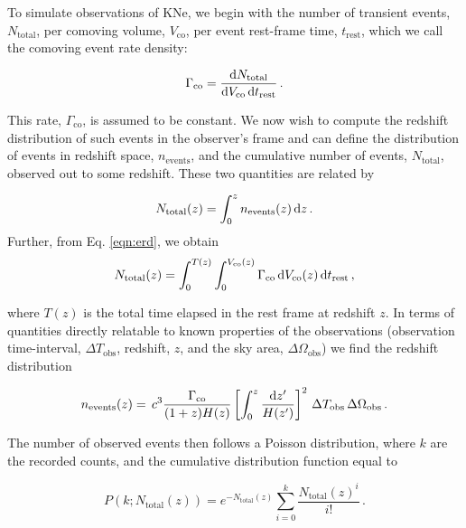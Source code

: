 To simulate observations of KNe, we begin with the number of transient events, $N_{\mathrm{total}}$, per comoving volume, $V_{\mathrm{co}}$, per event rest-frame time, $t_{\mathrm{rest}}$, which we call the comoving event rate density:

\begin{equation}\label{eqn:erd}
   \Gamma_{\mathrm{co}} =\frac{\mathrm{d} N_{\mathrm{total}}}{\mathrm{d} V_{\mathrm{co}}\, \mathrm{d} t_{\mathrm{rest}}}\,.
\end{equation}

This rate, $\Gamma_{\mathrm{co}}$, is assumed to be constant. We now wish to compute the redshift distribution of such events in the observer's frame and can define the distribution of events in redshift space, $n_{\mathrm{events}}$, and the cumulative number of events, $N_{\mathrm{total}}$, observed out to some redshift. These two quantities are related by

\begin{equation}\label{eqn:total_dist}
N_{\mathrm{total}}(z) = \int_0^{z} n_{\mathrm{events}}(z) \, \mathrm{d} z\,.
\end{equation}
Further, from Eq. \ref{eqn:erd}, we obtain
\begin{equation}
N_{\mathrm{ total}}(z) = \int_0^{T (z)} \int_0^{V_{\mathrm{co}}(z)}  \Gamma_{\mathrm{co}} \, \mathrm{d} V_{\mathrm{co}}(z) \,\mathrm{d} t_{\mathrm{rest}} \, ,
\end{equation}

where $T(z)$ is the total time elapsed in the rest frame at redshift $z$. In terms of quantities directly relatable to known properties of the observations (observation time-interval, $\Delta T_{\mathrm{obs}}$, redshift, $z$, and the sky area, $\Delta \Omega_{\mathrm{obs}}$) we find the redshift distribution

\begin{align}\label{eqn:reddist}
n_{\mathrm{events}}(z) = \, c^3  \frac{\Gamma_{\mathrm{co}}}{(1+z)H(z)} \left[\int^{z}_0 \frac{\mathrm{d} z'}{H(z')} \right]^2 \, \Delta T_{\mathrm{obs}} \, \Delta \Omega_{\mathrm{obs}}\,.
\end{align}

The number of observed events then follows a Poisson distribution, where $k$ are the recorded counts, and the cumulative distribution function equal to

\begin{equation}\label{eqn:invcum}
P(k;N_{\mathrm{total}}(z)) =e^{-N_{\mathrm{ total}}(z)} \sum_{i=0}^k \frac{N_{\mathrm{ total}}(z)^i}{i!}\,.
\end{equation}

